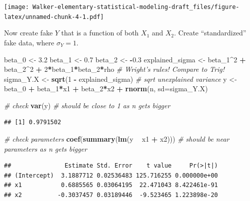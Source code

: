 \documentclass[]{book}
\newenvironment{Shaded}{\begin{snugshade}}{\end{snugshade}}
\newcommand{\KeywordTok}[1]{\textcolor[rgb]{0.13,0.29,0.53}{\textbf{#1}}}
\newcommand{\DataTypeTok}[1]{\textcolor[rgb]{0.13,0.29,0.53}{#1}}
\newcommand{\DecValTok}[1]{\textcolor[rgb]{0.00,0.00,0.81}{#1}}
\newcommand{\FloatTok}[1]{\textcolor[rgb]{0.00,0.00,0.81}{#1}}
\newcommand{\StringTok}[1]{\textcolor[rgb]{0.31,0.60,0.02}{#1}}
\newcommand{\CommentTok}[1]{\textcolor[rgb]{0.56,0.35,0.01}{\textit{#1}}}
\newcommand{\OperatorTok}[1]{\textcolor[rgb]{0.81,0.36,0.00}{\textbf{#1}}}
\newcommand{\NormalTok}[1]{#1}
\begin{document}
\texttt{[image: Walker-elementary-statistical-modeling-draft\_files/figure-latex/unnamed-chunk-4-1.pdf]}

Now create fake \(Y\) that is a function of both \(X_1\) and \(X_2\).
Create ``standardized'' fake data, where \(\sigma_Y = 1\).

\begin{Shaded}
\begin{Highlighting}[]
\NormalTok{beta_}\DecValTok{0}\NormalTok{ <-}\StringTok{ }\FloatTok{3.2}
\NormalTok{beta_}\DecValTok{1}\NormalTok{ <-}\StringTok{ }\FloatTok{0.7}
\NormalTok{beta_}\DecValTok{2}\NormalTok{ <-}\StringTok{ }\OperatorTok{-}\FloatTok{0.3}
\NormalTok{explained_sigma <-}\StringTok{ }\NormalTok{beta_}\DecValTok{1}\OperatorTok{^}\DecValTok{2} \OperatorTok{+}\StringTok{ }\NormalTok{beta_}\DecValTok{2}\OperatorTok{^}\DecValTok{2} \OperatorTok{+}\StringTok{ }\DecValTok{2}\OperatorTok{*}\NormalTok{beta_}\DecValTok{1}\OperatorTok{*}\NormalTok{beta_}\DecValTok{2}\OperatorTok{*}\NormalTok{rho }\CommentTok{# Wright's rules! Compare to Trig!}
\NormalTok{sigma_Y.X <-}\StringTok{ }\KeywordTok{sqrt}\NormalTok{(}\DecValTok{1} \OperatorTok{-}\StringTok{ }\NormalTok{explained_sigma) }\CommentTok{# sqrt unexplained variance}
\NormalTok{y <-}\StringTok{ }\NormalTok{beta_}\DecValTok{0} \OperatorTok{+}\StringTok{ }\NormalTok{beta_}\DecValTok{1}\OperatorTok{*}\NormalTok{x1 }\OperatorTok{+}\StringTok{ }\NormalTok{beta_}\DecValTok{2}\OperatorTok{*}\NormalTok{x2 }\OperatorTok{+}\StringTok{ }\KeywordTok{rnorm}\NormalTok{(n, }\DataTypeTok{sd=}\NormalTok{sigma_Y.X)}

\CommentTok{# check}
\KeywordTok{var}\NormalTok{(y) }\CommentTok{# should be close to 1 as n gets bigger}
\end{Highlighting}
\end{Shaded}

\begin{verbatim}
## [1] 0.9791502
\end{verbatim}

\begin{Shaded}
\begin{Highlighting}[]
\CommentTok{# check parameters}
\KeywordTok{coef}\NormalTok{(}\KeywordTok{summary}\NormalTok{(}\KeywordTok{lm}\NormalTok{(y }\OperatorTok{~}\StringTok{ }\NormalTok{x1 }\OperatorTok{+}\StringTok{ }\NormalTok{x2))) }\CommentTok{# should be near parameters as n gets bigger}
\end{Highlighting}
\end{Shaded}

\begin{verbatim}
##               Estimate Std. Error    t value     Pr(>|t|)
## (Intercept)  3.1887712 0.02536483 125.716255 0.000000e+00
## x1           0.6885565 0.03064195  22.471043 8.422461e-91
## x2          -0.3037457 0.03189446  -9.523465 1.223898e-20
\end{verbatim}
\end{document}
